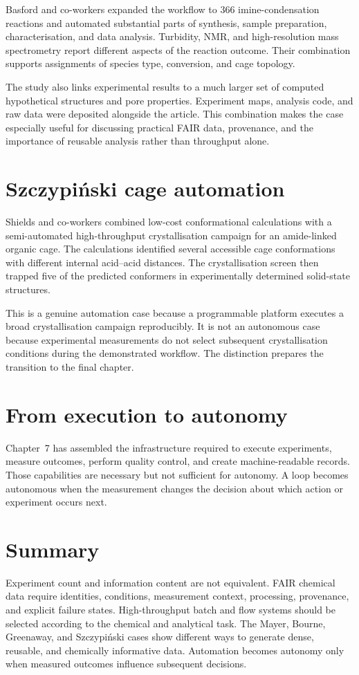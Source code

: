 Basford and co-workers expanded the workflow to 366 imine-condensation reactions and automated substantial parts of synthesis, sample preparation, characterisation, and data analysis.
Turbidity, NMR, and high-resolution mass spectrometry report different aspects of the reaction outcome.
Their combination supports assignments of species type, conversion, and cage topology.

The study also links experimental results to a much larger set of computed hypothetical structures and pore properties.
Experiment maps, analysis code, and raw data were deposited alongside the article.
This combination makes the case especially useful for discussing practical FAIR data, provenance, and the importance of reusable analysis rather than throughput alone.

\section{Szczypiński cage automation}

Shields and co-workers combined low-cost conformational calculations with a semi-automated high-throughput crystallisation campaign for an amide-linked organic cage.
The calculations identified several accessible cage conformations with different internal acid--acid distances.
The crystallisation screen then trapped five of the predicted conformers in experimentally determined solid-state structures.

This is a genuine automation case because a programmable platform executes a broad crystallisation campaign reproducibly.
It is not an autonomous case because experimental measurements do not select subsequent crystallisation conditions during the demonstrated workflow.
The distinction prepares the transition to the final chapter.

\section{From execution to autonomy}

Chapter~7 has assembled the infrastructure required to execute experiments, measure outcomes, perform quality control, and create machine-readable records.
Those capabilities are necessary but not sufficient for autonomy.
A loop becomes autonomous when the measurement changes the decision about which action or experiment occurs next.

\section{Summary}

Experiment count and information content are not equivalent.
FAIR chemical data require identities, conditions, measurement context, processing, provenance, and explicit failure states.
High-throughput batch and flow systems should be selected according to the chemical and analytical task.
The Mayer, Bourne, Greenaway, and Szczypiński cases show different ways to generate dense, reusable, and chemically informative data.
Automation becomes autonomy only when measured outcomes influence subsequent decisions.
